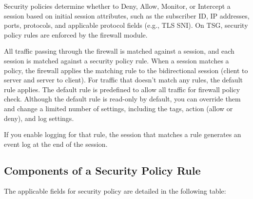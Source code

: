 Security policies determine whether to Deny, Allow, Monitor, or Intercept a session based on initial session attributes, 
such as the subscriber ID, IP addresses, ports, protocols, and applicable protocol fields (e.g., TLS SNI). 
On TSG, security policy rules are enforced by the firewall module.


All traffic passing through the firewall is matched against a session, and each session is matched against a security policy rule. 
When a session matches a policy, the firewall applies the matching rule to the bidirectional session (client to server and server to client). 
For traffic that doesn’t match any rules, the default rule applies. The default rule is predefined to allow all traffic for firewall policy check. 
Although the default rule is read-only by default, you can override them and change a limited number of settings, including the tags, action (allow or deny), and log settings.

If you enable logging for that rule, the session that matches a rule generates an event log at the end of the session. 

\subsection*{\hypertarget{link:Components of a Security Policy Rule}{Components of a Security Policy Rule}}
\label{sec:policies:security:component}

The applicable fields for security policy are detailed in the following table:\\


